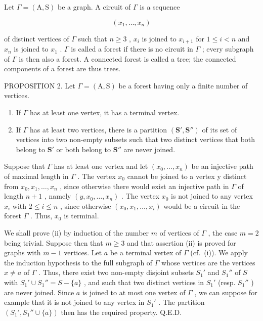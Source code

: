 
Let \(\Gamma = (\mathrm{A},\mathrm{S})\) be a graph. A circuit of \(\Gamma\) is a sequence

\[
(x _ {1}, \ldots , x _ {n})
\]

of distinct vertices of \(\Gamma\) such that \(n \geqslant 3\) , \(x_{i}\) is joined to \(x_{i+1}\) for \(1 \leqslant i < n\) and \(x_{n}\) is joined to \(x_{1}\) . \(\Gamma\) is called a forest if there is no circuit in \(\Gamma\) ; every subgraph of \(\Gamma\) is then also a forest. A connected forest is called a tree; the connected components of a forest are thus trees.

PROPOSITION 2. Let \(\Gamma = (\mathrm{A},\mathrm{S})\) be a forest having only a finite number of vertices.

\begin{enumerate}
\def\labelenumi{(\roman{enumi})}
\item
  If \(\Gamma\) has at least one vertex, it has a terminal vertex.
\item
  If \(\Gamma\) has at least two vertices, there is a partition \((\mathbf{S}', \mathbf{S}'')\) of its set of vertices into two non-empty subsets such that two distinct vertices that both belong to \(\mathbf{S}'\) or both belong to \(\mathbf{S}''\) are never joined.
\end{enumerate}

Suppose that \(\Gamma\) has at least one vertex and let \((x_{0},\ldots,x_{n})\) be an injective path of maximal length in \(\Gamma\) . The vertex \(x_{0}\) cannot be joined to a vertex y distinct from \(x_{0},x_{1},\ldots,x_{n}\) , since otherwise there would exist an injective path in \(\Gamma\) of length \(n+1\) , namely \((y,x_{0},\ldots,x_{n})\) . The vertex \(x_{0}\) is not joined to any vertex \(x_{i}\) with \(2\leqslant i\leqslant n\) , since otherwise \((x_{0},x_{1},\ldots,x_{i})\) would be a circuit in the forest \(\Gamma\) . Thus, \(x_{0}\) is terminal.

We shall prove (ii) by induction of the number \(m\) of vertices of \(\Gamma\) , the case \(m = 2\) being trivial. Suppose then that \(m \geqslant 3\) and that assertion (ii) is proved for graphs with \(m - 1\) vertices. Let \(a\) be a terminal vertex of \(\Gamma\) (cf.~(i)). We apply the induction hypothesis to the full subgraph of \(\Gamma\) whose vertices are the vertices \(x \neq a\) of \(\Gamma\) . Thus, there exist two non-empty disjoint subsets \(S_1'\) and \(S_1''\) of \(S\) with \(S_1' \cup S_1'' = S - \{a\}\) , and such that two distinct vertices in \(S_1'\) (resp. \(S_1''\) ) are never joined. Since \(a\) is joined to at most one vertex of \(\Gamma\) , we can suppose for example that it is not joined to any vertex in \(S_1'\) . The partition \((S_1', S_1'' \cup \{a\})\) then has the required property. Q.E.D.

